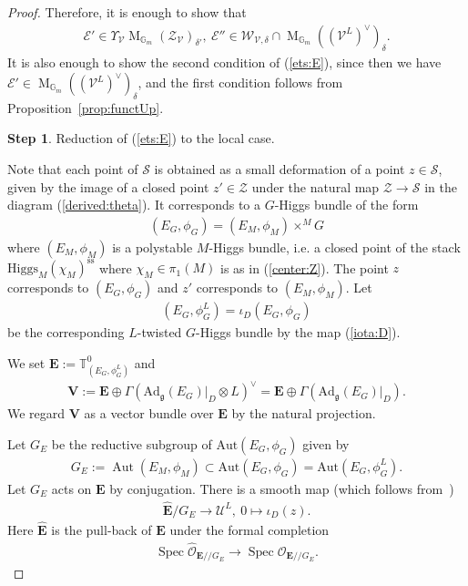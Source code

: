 \documentclass [11pt,oneside,a4paper,mathscr]{amsart}
\theoremstyle{definition}
\newtheorem{step}{Step}
\newcommand{\E}{\mathcal{E}}
\newcommand{\sS}{\mathcal{S}}
\newcommand{\zZ}{\mathcal{Z}}
\newcommand{\V}{\mathcal{V}}
\newcommand{\MM}{\operatorname{M}}
\newcommand{\fg}{\mathfrak{g}}
\newcommand{\Aut}{\operatorname{Aut}}
\newcommand{\Spec}{\operatorname{Spec}}
\newcommand{\Ad}{\mathrm{Ad}}
\newcommand{\ssslash}{/\!\!/}
\newcommand{\Hig}{\mathrm{Higgs}}
\begin{document}
\begin{proof}
Therefore, it is enough to show that 
\begin{align}\label{ets:E}
\E' \in \Upsilon_{\V} \MM_{\mathbb{G}_m}(\zZ_{\V})_{\delta'}, \ \E'' \in \mathcal{W}_{\V, \delta} \cap \MM_{\mathbb{G}_m}((\V^L)^{\vee})_{\delta}.     
\end{align}
It is also enough to show the second condition of (\ref{ets:E}), since then 
we have $\E' \in \MM_{\mathbb{G}_m}((\V^L)^{\vee})_{\delta}$, 
and the first condition follows from Proposition~\ref{prop:functUp}. 
\begin{step}
    Reduction of (\ref{ets:E}) to the local case. 
\end{step}
Note that each point of $\sS$ is obtained as a small deformation of a point $z \in \sS$, 
given by the image of a closed point $z'\in\mathcal{Z}$ under the natural map $\zZ \to \sS$
in the diagram (\ref{derived:theta}). 
It 
corresponds to a $G$-Higgs bundle of the form
\begin{align}\label{deg:E}
(E_G, \phi_G)=(E_M, \phi_M)\times^M G
\end{align}
where $(E_M, \phi_M)$ is a polystable $M$-Higgs bundle, i.e. a
closed point of the stack $\Hig_M(\chi_M)^{\mathrm{ss}}$ where $\chi_M\in \pi_1(M)$ 
is as in (\ref{center:Z}). The point $z$ corresponds to $(E_G, \phi_G)$ and $z'$ 
corresponds to $(E_M, \phi_M)$.
Let 
\begin{align*}
(E_G, \phi_G^{L})=\iota_D(E_G, \phi_G)
\end{align*}
be the corresponding $L$-twisted $G$-Higgs bundle by the map (\ref{iota:D}). 

We set 
    $\mathbf{E}:=\mathbb{T}^0_{(E_G, \phi_G^{L})}$ and 
\begin{align*}
    \mathbf{V}:= \mathbf{E}\oplus \Gamma(\Ad_{\fg}(E_G)|_{D}\otimes L)^{\vee}=
    \mathbf{E}\oplus \Gamma(\Ad_{\fg}(E_G)|_{D}).
\end{align*}
We regard $\mathbf{V}$ as a vector bundle over $\mathbf{E}$ by the natural 
projection. 

Let $G_E$ be the reductive subgroup of $\mathrm{Aut}(E_G, \phi_G)$ given by 
\begin{align*}
G_E :=\Aut(E_M, \phi_M) \subset \mathrm{Aut}(E_G, \phi_G)=\mathrm{Aut}(E_G, \phi_G^{L}).
\end{align*}
Let $G_E$ acts on $\mathbf{E}$ by conjugation. 
There is a smooth map (which follows from~\cite[Theorem~1.1]{AHRLuna})
\begin{align*}
    \widehat{\mathbf{E}}/G_E \to \mathcal{U}^L, \ 0 \mapsto \iota_D(z). 
\end{align*}
Here $\widehat{\mathbf{E}}$ is the pull-back of $\mathbf{E}$ under the 
formal completion 
\begin{align}\label{formal:comp}
    \Spec \widehat{\mathcal{O}}_{\mathbf{E}\ssslash G_E}
    \to  \Spec \mathcal{O}_{\mathbf{E}\ssslash G_E}.
\end{align}


\end{proof}
\end{document}
